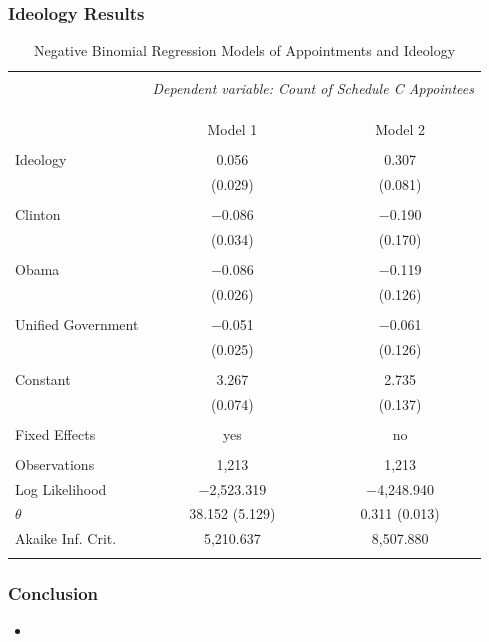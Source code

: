 \documentclass{beamer}
\begin{document}
\begin{frame}[fragile]
\frametitle{Ideology Results}
\tiny
\begin{table}[!h] \centering 
  \caption{Negative Binomial Regression Models of Appointments and Ideology} 
  \label{} 
\begin{tabular}{@{\extracolsep{5pt}}lcc} 
\\[-1.8ex]\hline 
\hline \\[-1.8ex] 
 & \multicolumn{2}{c}{\textit{Dependent variable: Count of Schedule C Appointees}} \\ 
\cline{2-3} 
\\[-1.8ex] & \multicolumn{2}{c}{} \\ 
\\[-1.8ex] & Model 1 & Model 2\\ 
\hline \\[-1.8ex] 
 Ideology & 0.056 & 0.307 \\ 
  & (0.029) & (0.081) \\ 
  & & \\ 
 Clinton & $-$0.086 & $-$0.190 \\ 
  & (0.034) & (0.170) \\ 
  & & \\ 
 Obama & $-$0.086 & $-$0.119 \\ 
  & (0.026) & (0.126) \\ 
  & & \\ 
 Unified Government & $-$0.051 & $-$0.061 \\ 
  & (0.025) & (0.126) \\ 
  & & \\ 
 Constant & 3.267 & 2.735 \\ 
  & (0.074) & (0.137) \\ 
  & & \\ 
  Fixed Effects & yes & no\\
\hline \\[-1.8ex] 
Observations & 1,213 & 1,213 \\ 
Log Likelihood & $-$2,523.319 & $-$4,248.940 \\ 
$\theta$ & 38.152  (5.129) & 0.311  (0.013) \\ 
Akaike Inf. Crit. & 5,210.637 & 8,507.880 \\ 
\hline 
\hline \\[-1.8ex] 
\end{tabular}
\end{table} 
\end{frame}

\begin{frame}[fragile]
\frametitle{Conclusion}
\begin{itemize}\addtolength{\itemsep}{1.5\baselineskip}
\item 
\end{itemize}
\end{frame}
\end{document}
